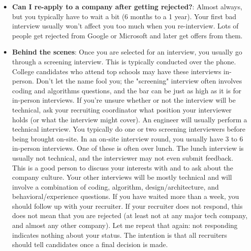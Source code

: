 \documentclass{report}
\begin{document}
\begin{itemize}
            \bigbreak \noindent 
            Interview questions are much the same way. Your interviewer develops a feel for your performance by comparing you to other people. It's not about the candidates she's interviewing that week. It's about all the candidates that she's ever asked this question to.
            \bigbreak \noindent 
            For this reason, getting a hard question isn't a bad thing. When it's harder for you, it's harder for everyone. It doesn't make it any less likely that you'll do well.
        \item \textbf{Can I re-apply to a company after getting rejected?}: Almost always, but you typically have to wait a bit (6 months to a 1 year). Your first bad interview usually won't affect you too much when you re-interview. Lots of people get rejected from Google or Microsoft and later get offers from them.  
        \item \textbf{Behind the scenes}: Once you are selected for an interview, you usually go through a screening interview. This is typically conducted over the phone. College candidates who attend top schools may have these interviews in-person. 
            \bigbreak \noindent 
            Don't let the name fool you; the "screening" interview often involves coding and algorithms questions, and the bar can be just as high as it is for in-person interviews. If you're unsure whether or not the interview will be technical, ask your recruiting coordinator what position your interviewer holds (or what the interview might cover). An engineer will usually perform a technical interview.
            \bigbreak \noindent 
            You typically do one or two screening interviewers before being brought on-site.
            \bigbreak \noindent 
            In an on-site interview round, you usually have 3 to 6 in-person interviews. One of these is often over lunch. The lunch interview is usually not technical, and the interviewer may not even submit feedback. This is a good person to discuss your interests with and to ask about the company culture. Your other interviews will be mostly technical and will involve a combination of coding, algorithm, design/architecture, and behavioral/experience questions. 
            \bigbreak \noindent 
            If you have waited more than a week, you should follow up with your recruiter. If your recruiter does not respond, this does not mean that you are rejected (at least not at any major tech company, and almost any other company). Let me repeat that again: not responding indicates nothing about your status. The intention is that all recruiters should tell candidates once a final decision is made. 

\end{itemize}
\end{document}
